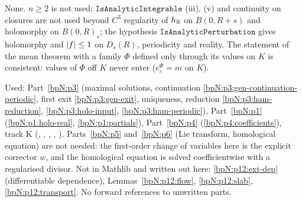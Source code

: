 \begin{remark}\label{bpN:p12:doubts}
None. $n\ge2$ is not used; $\texttt{IsAnalyticIntegrable}$ (iii), (v) and continuity on closures are not used beyond $C^3$ regularity of $h_{\mathbb{R}}$ on $B(0,R+s)$ and holomorphy on $B(0,R)_s$; the hypothesis $\texttt{IsAnalyticPerturbation}$ gives holomorphy and $\lvert f\rvert\le1$ on $D_s(R)$, periodicity and reality. The statement of the mean theorem with a family $\Phi$ defined only through its values on $K$ is consistent: values of $\Phi$ off $K$ never enter ($e^\Phi_\varepsilon=m$ on $K$).
\end{remark}

\begin{remark}\label{bpN:p12:fwd}
Used: Part~\ref{bpN:p3} (maximal solutions, continuation \ref{bpN:p3:gen-continuation-periodic}, first exit \ref{bpN:p3:gen-exit}, uniqueness, reduction \ref{bpN:p3:ham-reduction}, \ref{bpN:p3:holo-input}, \ref{bpN:p3:ham-periodic}), Part~\ref{bpN:p1} (\ref{bpN:p1:holo-real}, \ref{bpN:p1:partials}), Part~\ref{bpN:p4} (\ref{bpN:p4:coefficients}), track K (, , , , ). Parts~\ref{bpN:p5} and~\ref{bpN:p6} (Lie transform, homological equation) are not needed: the first-order change of variables here is the explicit corrector $w$, and the homological equation is solved coefficientwise with a regularised divisor. Not in Mathlib and written out here: \ref{bpN:p12:ext-dep} (differentiable dependence), Lemmas~\ref{bpN:p12:flow}, \ref{bpN:p12:slab}, \ref{bpN:p12:transport}. No forward references to unwritten parts.
\end{remark}
\endgroup
